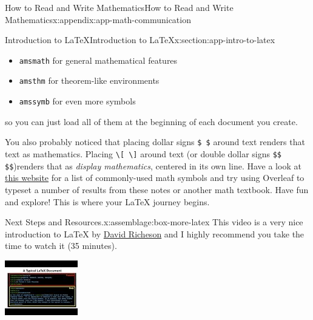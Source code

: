 \documentclass[oneside,10pt,]{book}
\newcommand{\mono}[1]{\texttt{#1}}
\numberwithin{equation}{section}
\newlength{\qrsize}
\newlength{\previewwidth}
\begin{document}
\begin{appendixptx}{How to Read and Write Mathematics}{}{How to Read and Write Mathematics}{}{}{x:appendix:app-math-communication}
\begin{sectionptx}{Introduction to \LaTeX{}}{}{Introduction to \LaTeX{}}{}{}{x:section:app-intro-to-latex}
\begin{itemize}[label=\textbullet]
\item{}\mono{amsmath} for general mathematical features%
\item{}\mono{amsthm} for theorem-like environments%
\item{}\mono{amssymb} for even more symbols%
\end{itemize}
so you can just load all of them at the beginning of each document you create.%
\par
You also probably noticed that placing dollar signs \mono{\$  \$} around text renders that text as mathematics. Placing \mono{\textbackslash{}[ \textbackslash{}]} around text (or double dollar signs \mono{\$\$   \$\$})renders that as \emph{display mathematics}, centered in its own line. Have a look at \href{https://artofproblemsolving.com/wiki/index.php/LaTeX:Symbols}{this website} for a list of commonly-used math symbols and try using Overleaf to typeset a number of results from these notes or another math textbook. Have fun and explore! This is where your \LaTeX{} journey begins.%
\begin{assemblage}{Next Steps and Resources.}{x:assemblage:box-more-latex}%
This video is a very nice introduction to \LaTeX{} by \href{https://divisbyzero.com/}{David Richeson} and I highly recommend you take the time to watch it (35 minutes).%
\begin{sidebyside}{1}{0}{0}{0}%
\begin{sbspanel}{1}%
\setlength{\qrsize}{9em}
\setlength{\previewwidth}{\linewidth}
\addtolength{\previewwidth}{-\qrsize}
\begin{tcbraster}[raster columns=2, raster column skip=1pt, raster halign=center, raster force size=false, raster left skip=0pt, raster right skip=0pt]%
\begin{tcolorbox}[previewstyle, width=\previewwidth]%
\includegraphics[width=0.80\linewidth,height=\qrsize,keepaspectratio]{images/video-latex.jpg}%

\end{tcolorbox}
\end{tcbraster}
\end{sbspanel}
\end{sidebyside}
\end{assemblage}
\end{sectionptx}
\end{appendixptx}
\end{document}
